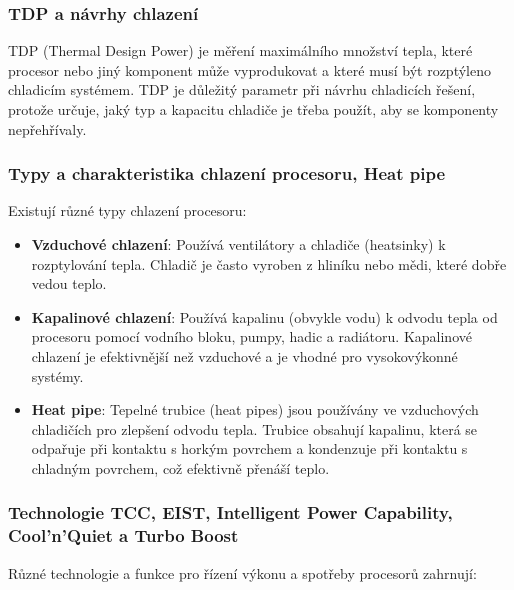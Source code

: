 \subsubsection{TDP a návrhy chlazení}
TDP (Thermal Design Power) je měření maximálního množství tepla, které procesor nebo jiný komponent může vyprodukovat a které musí být rozptýleno chladicím systémem. TDP je důležitý parametr při návrhu chladicích řešení, protože určuje, jaký typ a kapacitu chladiče je třeba použít, aby se komponenty nepřehřívaly.

\subsubsection{Typy a charakteristika chlazení procesoru, Heat pipe}
Existují různé typy chlazení procesoru:

\begin{itemize}
\item \textbf{Vzduchové chlazení}: Používá ventilátory a chladiče (heatsinky) k rozptylování tepla. Chladič je často vyroben z hliníku nebo mědi, které dobře vedou teplo.
\item \textbf{Kapalinové chlazení}: Používá kapalinu (obvykle vodu) k odvodu tepla od procesoru pomocí vodního bloku, pumpy, hadic a radiátoru. Kapalinové chlazení je efektivnější než vzduchové a je vhodné pro vysokovýkonné systémy.
\item \textbf{Heat pipe}: Tepelné trubice (heat pipes) jsou používány ve vzduchových chladičích pro zlepšení odvodu tepla. Trubice obsahují kapalinu, která se odpařuje při kontaktu s horkým povrchem a kondenzuje při kontaktu s chladným povrchem, což efektivně přenáší teplo.
\end{itemize}

\subsubsection{Technologie TCC, EIST, Intelligent Power Capability, Cool'n'Quiet a Turbo Boost}
Různé technologie a funkce pro řízení výkonu a spotřeby procesorů zahrnují:

